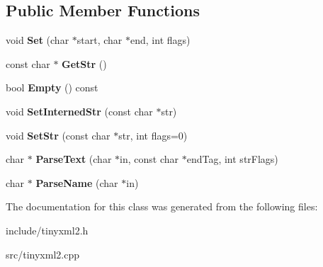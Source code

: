 \subsection*{Public Member Functions}
\begin{DoxyCompactItemize}
\item 
\hypertarget{classtinyxml2_1_1_str_pair_a4f05549373394266a1eecba26813c166}{}void {\bfseries Set} (char $\ast$start, char $\ast$end, int flags)\label{classtinyxml2_1_1_str_pair_a4f05549373394266a1eecba26813c166}

\item 
\hypertarget{classtinyxml2_1_1_str_pair_ad87e3d11330f5e689ba1e7e54c023b57}{}const char $\ast$ {\bfseries Get\+Str} ()\label{classtinyxml2_1_1_str_pair_ad87e3d11330f5e689ba1e7e54c023b57}

\item 
\hypertarget{classtinyxml2_1_1_str_pair_affa1043e73a18f05d5d2faec055725a7}{}bool {\bfseries Empty} () const \label{classtinyxml2_1_1_str_pair_affa1043e73a18f05d5d2faec055725a7}

\item 
\hypertarget{classtinyxml2_1_1_str_pair_a2baf6230e18333e02ab65d0897ee3941}{}void {\bfseries Set\+Interned\+Str} (const char $\ast$str)\label{classtinyxml2_1_1_str_pair_a2baf6230e18333e02ab65d0897ee3941}

\item 
\hypertarget{classtinyxml2_1_1_str_pair_a1f82ec6b5bee35ee7466d8565e43b1de}{}void {\bfseries Set\+Str} (const char $\ast$str, int flags=0)\label{classtinyxml2_1_1_str_pair_a1f82ec6b5bee35ee7466d8565e43b1de}

\item 
\hypertarget{classtinyxml2_1_1_str_pair_ad90521f188e9606a8fbafe5d86fb2246}{}char $\ast$ {\bfseries Parse\+Text} (char $\ast$in, const char $\ast$end\+Tag, int str\+Flags)\label{classtinyxml2_1_1_str_pair_ad90521f188e9606a8fbafe5d86fb2246}

\item 
\hypertarget{classtinyxml2_1_1_str_pair_aa6d8998efceba41d87ec2300c70a6085}{}char $\ast$ {\bfseries Parse\+Name} (char $\ast$in)\label{classtinyxml2_1_1_str_pair_aa6d8998efceba41d87ec2300c70a6085}

\end{DoxyCompactItemize}


The documentation for this class was generated from the following files\+:\begin{DoxyCompactItemize}
\item 
include/tinyxml2.\+h\item 
src/tinyxml2.\+cpp\end{DoxyCompactItemize}
